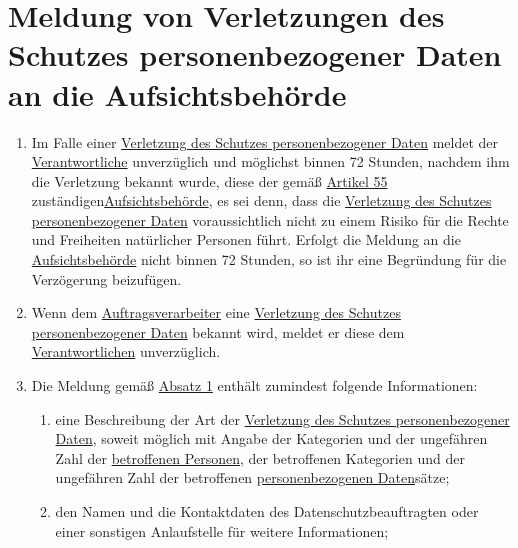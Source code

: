 \chapter{Meldung von Verletzungen des Schutzes personenbezogener Daten an die Aufsichtsbehörde}
\label{ch:33}


\begin{enumerate}

  \item Im Falle einer \hyperref[itm:04-12]{Verletzung des Schutzes personenbezogener Daten} meldet der \hyperref
   [itm:04-7]{Verantwortliche} unverzüglich und möglichst binnen 72 Stunden, nachdem ihm die Verletzung bekannt wurde,
   diese der gemäß \hyperref[ch:55]{Artikel 55} zuständigen\hyperref[itm:04-21]{Aufsichtsbehörde}, es sei denn, dass
   die \hyperref[itm:04-12]{Verletzung des Schutzes personenbezogener Daten} voraussichtlich nicht zu einem Risiko für
   die Rechte und Freiheiten natürlicher Personen führt. Erfolgt die Meldung an die \hyperref[itm:04-21]
   {Aufsichtsbehörde} nicht binnen 72 Stunden, so ist ihr eine Begründung für die Verzögerung beizufügen.%
  \label{itm:33-1}

  \item Wenn dem \hyperref[itm:04-8]{Auftragsverarbeiter} eine \hyperref[itm:04-12]{Verletzung des Schutzes
   personenbezogener Daten} bekannt wird, meldet er diese dem \hyperref[itm:04-7]{Verantwortlichen} unverzüglich.%
  \label{itm:33-2}

  \item Die Meldung gemäß \hyperref[itm:33-1]{Absatz 1} enthält zumindest folgende Informationen:%
  \label{itm:33-3}

  \begin{enumerate}
  
    \item eine Beschreibung der Art der \hyperref[itm:04-12]{Verletzung des Schutzes personenbezogener Daten}, soweit
     möglich mit Angabe der Kategorien und der ungefähren Zahl der \hyperref[itm:04-1]{betroffenen Personen}, der
     betroffenen Kategorien und der ungefähren Zahl der betroffenen \hyperref[itm:04-1]{personenbezogenen Daten}sätze;%
    \label{itm:33-3a}

    \item den Namen und die Kontaktdaten des Datenschutzbeauftragten oder einer sonstigen Anlaufstelle für weitere
     Informationen;%
    \label{itm:33-3b}


\end{enumerate}
\end{enumerate}
